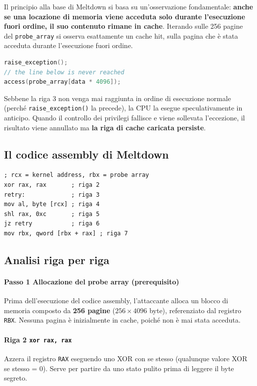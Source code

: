 \documentclass{article}
\begin{document}
Il principio alla base di Meltdown si basa su un'osservazione fondamentale:
\textbf{anche se una locazione di memoria viene acceduta solo durante 
l'esecuzione fuori ordine, il suo contenuto rimane in cache}. Iterando 
sulle 256 pagine del \texttt{probe\_array} si osserva esattamente un 
cache hit, sulla pagina che è stata acceduta durante l'esecuzione 
fuori ordine.

\begin{lstlisting}[language=C]
raise_exception();
// the line below is never reached
access(probe_array[data * 4096]);
\end{lstlisting}

Sebbene la riga 3 non venga mai raggiunta in ordine di esecuzione normale 
(perché \texttt{raise\_exception()} la precede), la CPU la esegue 
speculativamente in anticipo. Quando il controllo dei privilegi fallisce 
e viene sollevata l'eccezione, il risultato viene annullato ma 
\textbf{la riga di cache caricata persiste}.

\subsection*{Il codice assembly di Meltdown}

\begin{lstlisting}[language={[x86masm]Assembler}]
; rcx = kernel address, rbx = probe array
xor rax, rax       ; riga 2
retry:             ; riga 3
mov al, byte [rcx] ; riga 4
shl rax, 0xc       ; riga 5
jz retry           ; riga 6
mov rbx, qword [rbx + rax] ; riga 7
\end{lstlisting}

\subsection*{Analisi riga per riga}

\paragraph{Passo 1 Allocazione del probe array (prerequisito)}
Prima dell'esecuzione del codice assembly, l'attaccante alloca un blocco 
di memoria composto da \textbf{256 pagine} ($256 \times 4096$ byte), 
referenziato dal registro \texttt{RBX}. Nessuna pagina è inizialmente 
in cache, poiché non è mai stata acceduta.

\paragraph{Riga 2 \texttt{xor rax, rax}}
Azzera il registro \texttt{RAX} eseguendo uno XOR con se stesso 
(qualunque valore XOR se stesso = 0). Serve per partire da uno 
stato pulito prima di leggere il byte segreto.
\end{document}
